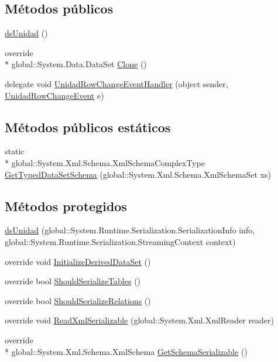 \subsection*{Métodos públicos}
\begin{DoxyCompactItemize}
\item 
\hyperlink{class_proyecto___integrador__3_1_1ds_unidad_ab6be91d0b9503d2e08dacc48aaaf6446}{ds\-Unidad} ()
\item 
override \\*
global\-::\-System.\-Data.\-Data\-Set \hyperlink{class_proyecto___integrador__3_1_1ds_unidad_ad50ce5632222d5d4b14388a90c3949cd}{Clone} ()
\item 
delegate void \hyperlink{class_proyecto___integrador__3_1_1ds_unidad_a351cda84e90913df1583510ff35bd48d}{Unidad\-Row\-Change\-Event\-Handler} (object sender, \hyperlink{class_proyecto___integrador__3_1_1ds_unidad_1_1_unidad_row_change_event}{Unidad\-Row\-Change\-Event} e)
\end{DoxyCompactItemize}
\subsection*{Métodos públicos estáticos}
\begin{DoxyCompactItemize}
\item 
static \\*
global\-::\-System.\-Xml.\-Schema.\-Xml\-Schema\-Complex\-Type \hyperlink{class_proyecto___integrador__3_1_1ds_unidad_aa5a56d2c39b52246f40a12eda82883d7}{Get\-Typed\-Data\-Set\-Schema} (global\-::\-System.\-Xml.\-Schema.\-Xml\-Schema\-Set xs)
\end{DoxyCompactItemize}
\subsection*{Métodos protegidos}
\begin{DoxyCompactItemize}
\item 
\hyperlink{class_proyecto___integrador__3_1_1ds_unidad_a9d5496ffefb43b59ba2420116b3e2d4a}{ds\-Unidad} (global\-::\-System.\-Runtime.\-Serialization.\-Serialization\-Info info, global\-::\-System.\-Runtime.\-Serialization.\-Streaming\-Context context)
\item 
override void \hyperlink{class_proyecto___integrador__3_1_1ds_unidad_ac07b966c4ac3259fd73bee4f81126c61}{Initialize\-Derived\-Data\-Set} ()
\item 
override bool \hyperlink{class_proyecto___integrador__3_1_1ds_unidad_a6982015d2a16c61dffbe6abf7cf07478}{Should\-Serialize\-Tables} ()
\item 
override bool \hyperlink{class_proyecto___integrador__3_1_1ds_unidad_a77c6010bdd6224c53a5be25776db3f8f}{Should\-Serialize\-Relations} ()
\item 
override void \hyperlink{class_proyecto___integrador__3_1_1ds_unidad_a064b596793a1a55b0296efd51a5e850e}{Read\-Xml\-Serializable} (global\-::\-System.\-Xml.\-Xml\-Reader reader)
\item 
override \\*
global\-::\-System.\-Xml.\-Schema.\-Xml\-Schema \hyperlink{class_proyecto___integrador__3_1_1ds_unidad_a094f29a5828868f8d88d76bd813b4b50}{Get\-Schema\-Serializable} ()
\end{DoxyCompactItemize}
